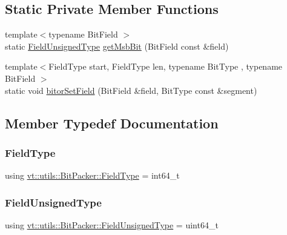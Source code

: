 \subsection*{Static Private Member Functions}
\begin{DoxyCompactItemize}
\item 
{\footnotesize template$<$typename Bit\+Field $>$ }\\static \hyperlink{structvt_1_1utils_1_1_bit_packer_a0bbc37c21a19e6c5311c6e9282a1e6f8}{Field\+Unsigned\+Type} \hyperlink{structvt_1_1utils_1_1_bit_packer_a6806b7d631e1fbcd44e50b02df8f93d6}{get\+Msb\+Bit} (Bit\+Field const \&field)
\item 
{\footnotesize template$<$Field\+Type start, Field\+Type len, typename Bit\+Type , typename Bit\+Field $>$ }\\static void \hyperlink{structvt_1_1utils_1_1_bit_packer_a21b7e6fed5cddc8c74ac1de98fe1de3e}{bitor\+Set\+Field} (Bit\+Field \&field, Bit\+Type const \&segment)
\end{DoxyCompactItemize}


\subsection{Member Typedef Documentation}
\mbox{\label{structvt_1_1utils_1_1_bit_packer_a23024285425933c1f10c8fc3942f9beb}} 
\subsubsection{\texorpdfstring{Field\+Type}{FieldType}}
{\footnotesize\ttfamily using \hyperlink{structvt_1_1utils_1_1_bit_packer_a23024285425933c1f10c8fc3942f9beb}{vt\+::utils\+::\+Bit\+Packer\+::\+Field\+Type} =  int64\+\_\+t}

\mbox{\label{structvt_1_1utils_1_1_bit_packer_a0bbc37c21a19e6c5311c6e9282a1e6f8}} 
\subsubsection{\texorpdfstring{Field\+Unsigned\+Type}{FieldUnsignedType}}
{\footnotesize\ttfamily using \hyperlink{structvt_1_1utils_1_1_bit_packer_a0bbc37c21a19e6c5311c6e9282a1e6f8}{vt\+::utils\+::\+Bit\+Packer\+::\+Field\+Unsigned\+Type} =  uint64\+\_\+t}



